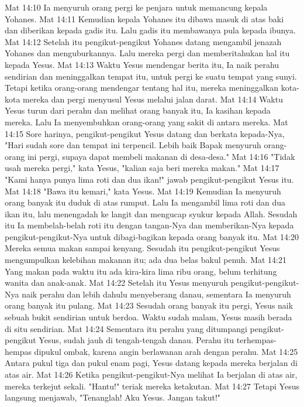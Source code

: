 Mat 14:10  Ia menyuruh orang pergi ke penjara untuk memancung kepala Yohanes.
Mat 14:11  Kemudian kepala Yohanes itu dibawa masuk di atas baki dan diberikan kepada gadis itu. Lalu gadis itu membawanya pula kepada ibunya.
Mat 14:12  Setelah itu pengikut-pengikut Yohanes datang mengambil jenazah Yohanes dan menguburkannya. Lalu mereka pergi dan memberitahukan hal itu kepada Yesus.
Mat 14:13  Waktu Yesus mendengar berita itu, Ia naik perahu sendirian dan meninggalkan tempat itu, untuk pergi ke suatu tempat yang sunyi. Tetapi ketika orang-orang mendengar tentang hal itu, mereka meninggalkan kota-kota mereka dan pergi menyusul Yesus melalui jalan darat.
Mat 14:14  Waktu Yesus turun dari perahu dan melihat orang banyak itu, Ia kasihan kepada mereka. Lalu Ia menyembuhkan orang-orang yang sakit di antara mereka.
Mat 14:15  Sore harinya, pengikut-pengikut Yesus datang dan berkata kepada-Nya, "Hari sudah sore dan tempat ini terpencil. Lebih baik Bapak menyuruh orang-orang ini pergi, supaya dapat membeli makanan di desa-desa."
Mat 14:16  "Tidak usah mereka pergi," kata Yesus, "kalian saja beri mereka makan."
Mat 14:17  "Kami hanya punya lima roti dan dua ikan!" jawab pengikut-pengikut Yesus itu.
Mat 14:18  "Bawa itu kemari," kata Yesus.
Mat 14:19  Kemudian Ia menyuruh orang banyak itu duduk di atas rumput. Lalu Ia mengambil lima roti dan dua ikan itu, lalu menengadah ke langit dan mengucap syukur kepada Allah. Sesudah itu Ia membelah-belah roti itu dengan tangan-Nya dan memberikan-Nya kepada pengikut-pengikut-Nya untuk dibagi-bagikan kepada orang banyak itu.
Mat 14:20  Mereka semua makan sampai kenyang. Sesudah itu pengikut-pengikut Yesus mengumpulkan kelebihan makanan itu; ada dua belas bakul penuh.
Mat 14:21  Yang makan pada waktu itu ada kira-kira lima ribu orang, belum terhitung wanita dan anak-anak.
Mat 14:22  Setelah itu Yesus menyuruh pengikut-pengikut-Nya naik perahu dan lebih dahulu menyeberang danau, sementara Ia menyuruh orang banyak itu pulang.
Mat 14:23  Sesudah orang banyak itu pergi, Yesus naik sebuah bukit sendirian untuk berdoa. Waktu sudah malam, Yesus masih berada di situ sendirian.
Mat 14:24  Sementara itu perahu yang ditumpangi pengikut-pengikut Yesus, sudah jauh di tengah-tengah danau. Perahu itu terhempas-hempas dipukul ombak, karena angin berlawanan arah dengan perahu.
Mat 14:25  Antara pukul tiga dan pukul enam pagi, Yesus datang kepada mereka berjalan di atas air.
Mat 14:26  Ketika pengikut-pengikut-Nya melihat Ia berjalan di atas air, mereka terkejut sekali. "Hantu!" teriak mereka ketakutan.
Mat 14:27  Tetapi Yesus langsung menjawab, "Tenanglah! Aku Yesus. Jangan takut!"
